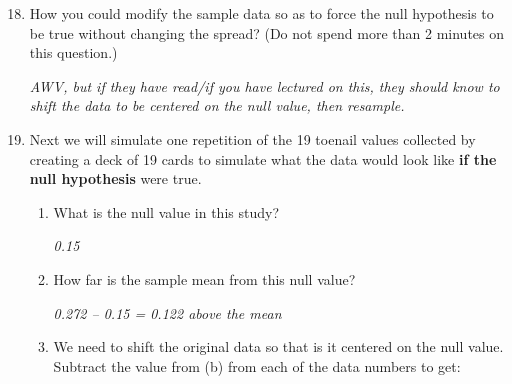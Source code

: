 \begin{enumerate}
\setcounter{enumi}{17}
\item How you could modify the sample data so as to force the null
  hypothesis to be true without changing the spread?  (Do not spend
  more than 2 minutes on this question.)
\begin{students}
  \vspace{2cm}
\end{students}

\begin{key}
  {\it  AWV, but if they have read/if you have lectured on this, they
    should know to shift the data to be centered on the null value,
    then resample.} 
\end{key}

\item Next we will simulate one repetition of the 19 toenail values
  collected by creating a deck of 19 cards to simulate what the data
  would look like {\bf if the null hypothesis} were true.
    \begin{enumerate}
    \item  What is the null value in this study?
\begin{students}
  \vspace{2cm}
\end{students}

\begin{key}
  {\it 0.15}
\end{key}
\item  \label{shift}How far is the sample mean from this null value?
\begin{students}
  \vspace{2cm}
\end{students}

\begin{key}
  {\it 0.272 – 0.15 = 0.122 above the mean}
\end{key}
\item We need to shift the original data so that is it centered on the null
      value.  %
      Subtract the value from (b) from each of the data numbers to
      get:


\end{enumerate}
\end{enumerate}
